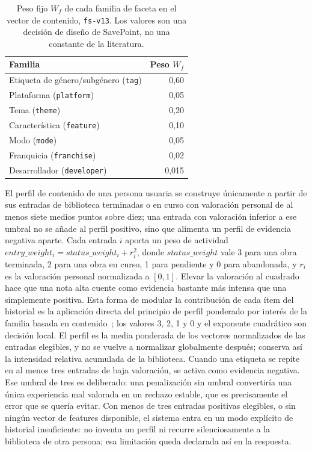 \begin{table}[H]
\centering
\caption{Peso fijo \(W_f\) de cada familia de faceta en el vector de contenido,
\texttt{fs-v13}. Los valores son una decisión de diseño de SavePoint, no una constante de la
literatura.}\label{tab:pesos-familia}
\begin{tabularx}{\textwidth}{@{}Yr@{}}
\textnormal{Familia} & \textnormal{Peso \(W_f\)} \\
\hline
Etiqueta de género/subgénero (\texttt{tag}) & 0,60 \\
Plataforma (\texttt{platform}) & 0,05 \\
Tema (\texttt{theme}) & 0,20 \\
Característica (\texttt{feature}) & 0,10 \\
Modo (\texttt{mode}) & 0,05 \\
Franquicia (\texttt{franchise}) & 0,02 \\
Desarrollador (\texttt{developer}) & 0,015 \\
\end{tabularx}
\end{table}

El perfil de contenido de una persona usuaria se construye únicamente a partir de sus
entradas de biblioteca terminadas o en curso con valoración personal de al menos siete medios
puntos sobre diez; una entrada con valoración inferior a ese umbral no se añade al perfil
positivo, sino que alimenta un perfil de evidencia negativa aparte. Cada entrada \(i\) aporta
un peso de actividad \(entry\_weight_i = status\_weight_i + r_i^2\), donde \(status\_weight\)
vale 3 para una obra terminada, 2 para una obra en curso, 1 para pendiente y 0 para abandonada,
y \(r_i\) es la valoración personal normalizada a \([0,1]\). Elevar la valoración al cuadrado
hace que una nota alta cuente como evidencia bastante más intensa que una simplemente
positiva. Esta forma de modular la contribución de cada ítem del historial es la aplicación
directa del principio de perfil ponderado por interés de la familia basada en
contenido~\cite{pazzani2007content}; los valores 3, 2, 1 y 0 y el exponente cuadrático son
decisión local. El perfil es la media ponderada de los vectores normalizados de las entradas
elegibles, y no se vuelve a normalizar globalmente después; conserva así la intensidad relativa
acumulada de la biblioteca. Cuando una etiqueta se repite en al menos tres entradas de baja
valoración, se activa como evidencia negativa. Ese umbral de tres es deliberado: una
penalización sin umbral convertiría una única experiencia mal valorada en un rechazo estable,
que es precisamente el error que se quería evitar. Con menos de tres entradas positivas
elegibles, o sin ningún vector de features disponible, el sistema entra en un modo explícito de
historial insuficiente: no inventa un perfil ni recurre silenciosamente a la biblioteca de otra
persona; esa limitación queda declarada así en la respuesta.

